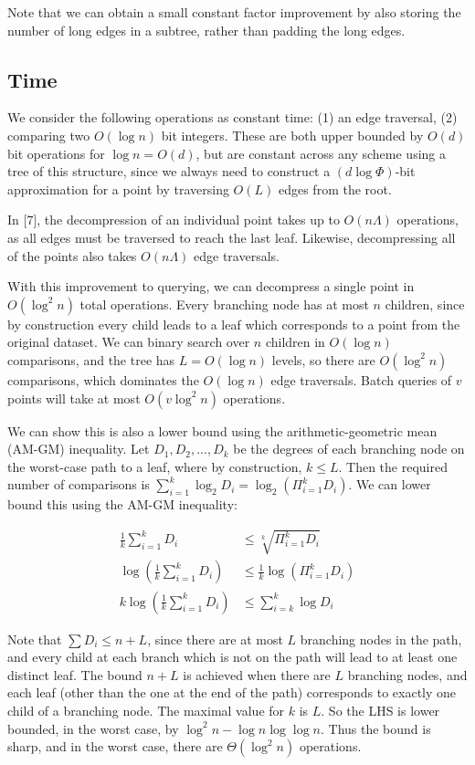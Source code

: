 \documentclass{article}
\begin{document}
Note that we can obtain a small constant factor improvement by also storing the
number of long edges in a subtree, rather than padding the long edges.

\subsection{Time}

We consider the following operations as constant time: (1) an edge traversal,
(2) comparing two $O(\log n)$ bit integers. These are both upper bounded by
$O(d)$ bit operations for $\log n = O(d)$, but are constant across any scheme
using a tree of this structure, since we always need to construct a $(d \log
\Phi)$-bit approximation for a point by traversing $O(L)$ edges from the root.

In [7], the decompression of an individual point takes up to $O(n\Lambda)$ operations,
as all edges must be traversed to reach the last leaf. Likewise, decompressing
all of the points also takes $O(n\Lambda)$ edge traversals.

With this improvement to querying, we can decompress a single point in $O(\log^2
n)$ total operations. Every branching node has at most $n$ children, since by
construction every child leads to a leaf which corresponds to a point from the
original dataset. We can binary search over $n$ children in $O(\log n)$
comparisons, and the tree has $L = O(\log n)$ levels, so there are $O(\log^2 n)$
comparisons, which dominates the $O(\log n)$ edge traversals. Batch queries of
$v$ points will take at most $O(v \log^2 n)$ operations.

We can show this is also a lower bound using the arithmetic-geometric mean
(AM-GM) inequality. Let $D_1,D_2,...,D_k$ be the degrees of each branching node
on the worst-case path to a leaf, where by construction, $k \leq L$. Then the
required number of comparisons is $\sum_{i=1}^k \log_2 D_i = \log_2(\Pi_{i=1}^k
D_i)$. We can lower bound this using the AM-GM inequality:

\begin{align}
  \frac{1}{k} \sum_{i=1}^k D_i &\leq \sqrt[k]{\Pi_{i=1}^k D_i} \\
  \log (\frac{1}{k} \sum_{i=1}^k D_i) &\leq \frac{1}{k} \log (\Pi_{i=1}^k D_i) \\
  k \log (\frac{1}{k} \sum_{i=1}^k D_i) &\leq \sum_{i=k}^k \log D_i
\end{align}

Note that $\sum D_i \leq n + L$, since there are at most $L$ branching nodes in the
path, and every child at each branch which is not on the path will lead to at
least one distinct leaf. The bound $n + L$ is achieved when there are $L$
branching nodes, and each leaf (other than the one at the end of the path)
corresponds to exactly one child of a branching node. The maximal value for $k$
is $L$. So the LHS is lower bounded, in the worst case, by $\log^2 n - \log n
\log \log n$. Thus the bound is sharp, and in the worst case, there are
$\Theta(\log^2 n)$ operations.
\end{document}
